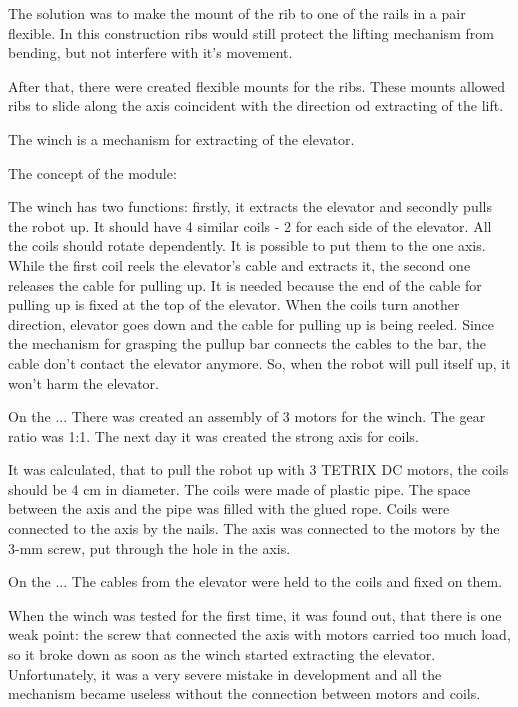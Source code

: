 \begin{enumerate*}
  The solution was to make the mount of the rib to one of the rails in a pair flexible. In this construction ribs would still protect the lifting mechanism from bending, but not interfere with it's movement.

  \item After that, there were created flexible mounts for the ribs. These mounts allowed ribs to slide along the axis coincident with the direction od extracting of the lift.




  The winch is a mechanism for extracting of the elevator.

  The concept of the module:

  The winch has two functions: firstly, it extracts the elevator and secondly pulls the robot up. It should have 4 similar coils - 2 for each side of the elevator. All the coils should rotate dependently. It is possible to put them to the one axis. While the first coil reels the elevator's cable and extracts it, the second one releases the cable for pulling up. It is needed because the end of the cable for pulling up is fixed at the top of the elevator. When the coils turn another direction, elevator goes down and the cable for pulling up is being reeled.
  Since the mechanism for grasping the pullup bar connects the cables to the bar, the cable don't contact the elevator anymore. So, when the robot will pull itself up, it won't harm the elevator.

  On the ... There was created an assembly of 3 motors for the winch. The gear ratio was 1:1. The next day it was created the strong axis for coils.

  It was calculated, that to pull the robot up with 3 TETRIX DC motors, the coils should be 4 cm in diameter. The coils were made of plastic pipe. The space between the axis and the pipe was filled with the glued rope. Coils were connected to the axis by the nails. The axis was connected to the motors by the 3-mm screw, put through the hole in the axis.

  On the ... The cables from the elevator were held to the coils and fixed on them.

  When the winch was tested for the first time, it was found out, that there is one weak point: the screw that connected the axis with motors carried too much load, so it broke down as soon as the winch started extracting the elevator. Unfortunately, it was a very severe mistake in development and all the mechanism became useless without the connection between motors and coils.


\end{enumerate*}
